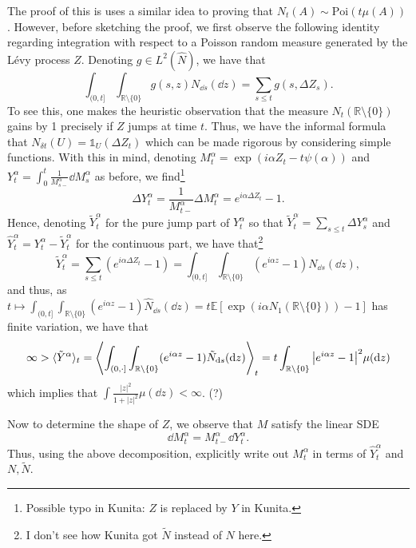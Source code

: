 \documentclass[]{article}
\theoremstyle{definition}
\theoremstyle{definition}
\begin{document}
The proof of this is uses a similar idea to proving that \(N_t(A) \sim \text{Poi}(t\mu(A))\). However, before 
sketching the proof, we first observe the following identity regarding integration with respect to a 
Poisson random measure generated by the L\'evy process \(Z\). Denoting \(g \in L^2(\hat N)\), we have that
\[\int_{(0, t]} \int_{\mathbb{R} \setminus \{0\}} g(s, z) N_{\dd s}(\dd z) = \sum_{s \le t} g(s, \Delta Z_s).\]
To see this, one makes the heuristic observation that the measure \(N_t(\mathbb{R} \setminus \{0\})\) gains by 1 
precisely if \(Z\) jumps at time \(t\). Thus, we have the informal formula that 
\(N_{\delta t}(U) = \mathbb{1}_U(\Delta Z_t)\) which can be made rigorous by considering simple functions.
With this in mind, denoting \(M_t^\alpha = \exp(i\alpha Z_t - t \psi(\alpha))\) and 
\(Y_t^\alpha = \int_0^t \frac{1}{M_{s-}^\alpha} \dd M_s^\alpha\) as before, we find\footnote{Possible typo in Kunita: \(Z\) 
is replaced by \(Y\) in Kunita.} 
\[\Delta Y_t^\alpha = \frac{1}{M_{t-}^\alpha}\Delta M_t^\alpha = e^{i\alpha \Delta Z_t} - 1.\]
Hence, denoting \(\tilde Y_t^\alpha\) for the pure jump part of \(Y_t^\alpha\) so that 
\(\tilde Y_t^\alpha = \sum_{s \le t} \Delta Y_s^\alpha\) and \(\hat Y_t^\alpha = Y_t^\alpha - \tilde Y_t^\alpha\) 
for the continuous part, we have that\footnote{I don't see how Kunita got \(\tilde N\) instead of \(N\) here.}
\[\tilde Y_t^\alpha = \sum_{s \le t} (e^{i\alpha \Delta Z_t} - 1) 
  = \int_{(0, t]} \int_{\mathbb{R}\setminus\{0\}} (e^{i\alpha z} - 1) N_{\dd s}(\dd z),\]
and thus, as \(t \mapsto \int_{(0, t]} \int_{\mathbb{R}\setminus\{0\}} (e^{i\alpha z} - 1) \hat N_{\dd s}(\dd z)
= t\mathbb{E}[\exp(i\alpha N_1(\mathbb{R} \setminus \{0\})) - 1]\) has finite variation, we have that 
\[\infty > \langle \tilde Y^\alpha \rangle_t 
  = \left\langle \int_{(0, \cdot]} \int_{\mathbb{R}\setminus\{0\}} (e^{i\alpha z} - 1) \tilde N_{\dd s}(\dd z)\right\rangle_t
  = t\int_{\mathbb{R}\setminus\{0\}} \abs{e^{i\alpha z} - 1}^2 \mu(\dd z)\]
which implies that \(\int \frac{|z|^2}{1 + |z|^2} \mu(\dd z) < \infty\). (?)

Now to determine the shape of \(Z\), we observe that \(M\) satisfy the linear SDE 
\[\dd M_t^\alpha = M_{t-}^\alpha \dd Y_t^\alpha.\]
Thus, using the above decomposition, explicitly write out \(M_t^\alpha\) in terms of \(\hat Y_t^\alpha\) 
and \(N, \tilde N\). 
\end{document}
